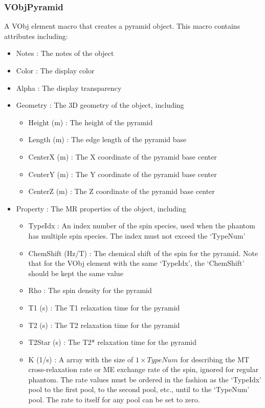 \documentclass{book}%
\begin{document}
\subsubsection{VObjPyramid}

A VObj element macro that creates a pyramid object. This macro contains attributes including:

\begin{itemize}
	\item Notes : The notes of the object
	\item Color : The display color
	\item Alpha : The display transparency
	\item Geometry : The 3D geometry of the object, including
	\begin{itemize}
		\item Height (m) : The height of the pyramid
		\item Length (m) : The edge length of the pyramid base
		\item CenterX (m) : The X coordinate of the pyramid base center
		\item CenterY (m) : The Y coordinate of the pyramid base center
		\item CenterZ (m) : The Z coordinate of the pyramid base center
	\end{itemize}
	\item Property : The MR properties of the object, including
	\begin{itemize}
		\item TypeIdx : An index number of the spin species, used when the phantom has multiple spin species. The index must not exceed the `TypeNum'
		\item ChemShift (Hz/T) : The chemical shift of the spin for the pyramid. Note that for the VObj element with the same `TypeIdx', the `ChemShift' should be kept the same value
		\item Rho : The spin density for the pyramid
		\item T1 (s) : The T1 relaxation time for the pyramid
		\item T2 (s) : The T2 relaxation time for the pyramid
		\item T2Star (s) : The T2* relaxation time for the pyramid
		\item K (1/s) : A array with the size of $1 \times TypeNum$ for describing the MT cross-relaxation rate or ME exchange rate of the spin, ignored for regular phantom. The rate values must be ordered in the fashion as the `TypeIdx' pool to the first pool, to the second pool, etc., until to the `TypeNum' pool. The rate to itself for any pool can be set to zero.
	\end{itemize}
\end{itemize}
\end{document}
